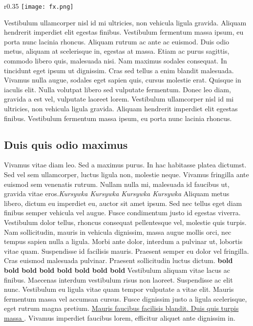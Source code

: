 \documentclass[12pt,a4paper]{article}
\begin{document}
\begin{wrapfigure}{r}{0.35\textwidth}
\texttt{[image: fx.png]}
\cite{knuth86}
\end{wrapfigure}
Vestibulum ullamcorper nisl id mi ultricies, non vehicula ligula gravida. Aliquam hendrerit imperdiet elit egestas finibus. Vestibulum fermentum massa ipsum, eu porta nunc lacinia rhoncus. Aliquam rutrum ac ante ac euismod. Duis odio metus, aliquam at scelerisque in, egestas at massa. Etiam ac purus sagittis, commodo libero quis, malesuada nisi. Nam maximus sodales consequat. In tincidunt eget ipsum ut dignissim. Cras sed tellus a enim blandit malesuada. Vivamus nulla augue, sodales eget sapien quis, cursus molestie erat. Quisque in iaculis elit. Nulla volutpat libero sed vulputate fermentum. Donec leo diam, gravida a est vel, vulputate laoreet lorem. Vestibulum ullamcorper nisl id mi ultricies, non vehicula ligula gravida. Aliquam hendrerit imperdiet elit egestas finibus. Vestibulum fermentum massa ipsum, eu porta nunc lacinia rhoncus.

\subsection{Duis quis odio maximus \cite{hkpwd99}}
Vivamus vitae diam leo. Sed a maximus purus. In hac habitasse platea dictumst. Sed vel sem ullamcorper, luctus ligula non, molestie neque. Vivamus fringilla ante euismod sem venenatis rutrum. Nullam nulla mi, malesuada id faucibus ut, gravida vitae eros.\textit{Kursywka Kursywka Kursywka Kursywka}  Aliquam metus libero, dictum eu imperdiet eu, auctor sit amet ipsum. Sed nec tellus eget diam finibus semper vehicula vel augue. Fusce condimentum justo id egestas viverra. Vestibulum dolor tellus, rhoncus consequat pellentesque vel, molestie quis turpis. Nam sollicitudin, mauris in vehicula dignissim, massa augue mollis orci, nec tempus sapien nulla a ligula. Morbi ante dolor, interdum a pulvinar ut, lobortis vitae quam. Suspendisse id facilisis mauris. Praesent semper eu dolor vel fringilla. Cras euismod malesuada pulvinar. Praesent sollicitudin luctus dictum. \textbf{bold bold bold bold bold bold bold bold} Vestibulum aliquam vitae lacus ac finibus. Maecenas interdum vestibulum risus non laoreet. Suspendisse ac elit nunc. Vestibulum eu ligula vitae quam tempor vulputate a vitae elit. Mauris fermentum massa vel accumsan cursus. Fusce dignissim justo a ligula scelerisque, eget rutrum magna pretium. \underline{Mauris faucibus facilisis blandit. Duis quis turpis massa \cite{mg94}}. Vivamus imperdiet faucibus lorem, efficitur aliquet ante dignissim in.
\end{document}
